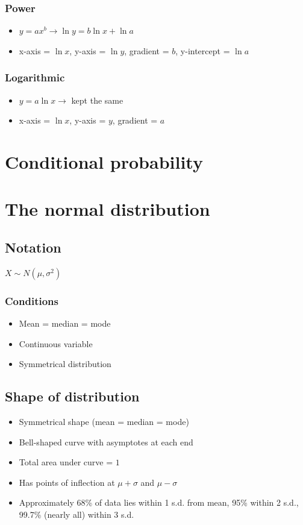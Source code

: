 \documentclass[oneside,fleqn,11pt]{book}
\begin{document}
	\subsection{Power}
	\begin{itemize}
		\item $y=ax^b\rightarrow\ln y = b\ln x + \ln a$
		\item x-axis = $\ln x$, y-axis = $\ln y$, gradient = $b$, y-intercept = $\ln a$
	\end{itemize}
	
	\subsection{Logarithmic}
	\begin{itemize}
		\item $y=a\ln x\rightarrow$ kept the same
		\item x-axis = $\ln x$, y-axis = $y$, gradient = $a$
	\end{itemize}
	
	\pagebreak
	
	\chapter{Conditional probability}
	
	\pagebreak
	
	\chapter{The normal distribution}
	
	\section{Notation}
	$X \sim N(\mu,\sigma^2)$
	\subsection{Conditions}
	\begin{itemize}
		\item Mean = median = mode
		\item Continuous variable
		\item Symmetrical distribution
	\end{itemize}
	\section{Shape of distribution}
	\begin{itemize}
		\item Symmetrical shape (mean = median = mode)
		\item Bell-shaped curve with asymptotes at each end
		\item Total area under curve = $1$
		\item Has points of inflection at $\mu+\sigma$ and $\mu-\sigma$
		\item Approximately 68\% of data lies within 1 s.d. from mean, 95\% within 2 s.d., 99.7\% (nearly all) within 3 s.d.
	\end{itemize}
	
\end{document}
